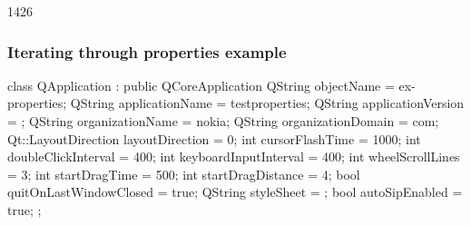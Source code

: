 \begin{slide}[fragile]{1426}
\frametitle{Iterating through properties example}
\begin{cpp}
class QApplication : public QCoreApplication {
  QString objectName = ex-properties;
  QString applicationName = testproperties;
  QString applicationVersion = ;
  QString organizationName = nokia;
  QString organizationDomain = com;
  Qt::LayoutDirection layoutDirection = 0;
  int cursorFlashTime = 1000;
  int doubleClickInterval = 400;
  int keyboardInputInterval = 400;
  int wheelScrollLines = 3;
  int startDragTime = 500;
  int startDragDistance = 4;
  bool quitOnLastWindowClosed = true;
  QString styleSheet = ;
  bool autoSipEnabled = true;
};
\end{cpp}
\end{slide}
